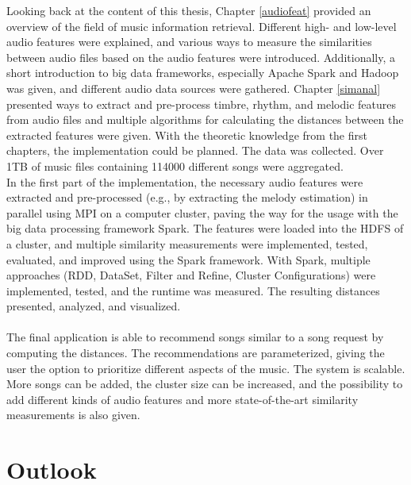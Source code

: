 Looking back at the content of this thesis, Chapter \ref{audiofeat} provided an overview of the field of music information retrieval. Different high- and low-level audio features were explained, and various ways to measure the similarities between audio files based on the audio features were introduced. Additionally, a short introduction to big data frameworks, especially Apache Spark and Hadoop was given, and different audio data sources were gathered. Chapter \ref{simanal} presented ways to extract and pre-process timbre, rhythm, and melodic features from audio files and multiple algorithms for calculating the distances between the extracted features were given. With the theoretic knowledge from the first chapters, the implementation could be planned. The data was collected. Over 1TB of music files containing 114000 different songs were aggregated.\\ 
In the first part of the implementation, the necessary audio features were extracted and pre-processed (e.g., by extracting the melody estimation) in parallel using MPI on a computer cluster, paving the way for the usage with the big data processing framework Spark.
The features were loaded into the HDFS of a cluster, and multiple similarity measurements were implemented, tested, evaluated, and improved using the Spark framework. With Spark, multiple approaches (RDD, DataSet, Filter and Refine, Cluster Configurations) were implemented, tested, and the runtime was measured. The resulting distances presented, analyzed, and visualized.\\
\ \\
The final application is able to recommend songs similar to a song request by computing the distances. The recommendations are parameterized, giving the user the option to prioritize different aspects of the music. The system is scalable. More songs can be added, the cluster size can be increased, and the possibility to add different kinds of audio features and more state-of-the-art similarity measurements is also given. 

\section{Outlook}


